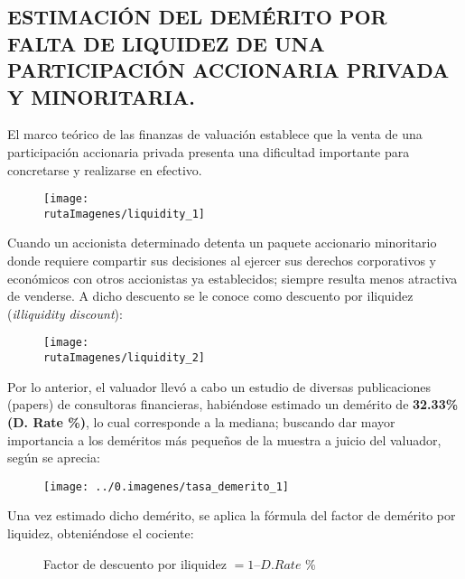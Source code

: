 \newcommand{\valorIliquidezM}{88}
\newcommand{\valorIliquidezm}{781}
\newcommand{\valorIliquidezc}{757}
\newcommand{\valorIliquidez}{\valorIliquidezM,\valorIliquidezm,\valorIliquidezc}
\newcommand{\valorIliquidezLetra}{\Numberstringnum{\valorIliquidezM}{} millones, \numberstringnum{\valorIliquidezm}{} mil, \numberstringnum{\valorIliquidezc}}


\subsection{ESTIMACI\'ON DEL DEM\'ERITO POR FALTA DE LIQUIDEZ DE UNA PARTICIPACIÓN ACCIONARIA PRIVADA Y MINORITARIA.}

El marco te\'orico de las finanzas de valuaci\'on establece que la venta de una participaci\'on accionaria privada presenta una dificultad importante para concretarse y realizarse en efectivo.

\begin{figure}[H]
\centering
\texttt{[image: \\rutaImagenes/liquidity\_1]}
\end{figure} 

Cuando un accionista determinado detenta un paquete accionario minoritario donde requiere compartir sus decisiones al ejercer sus derechos corporativos y econ\'omicos con otros accionistas ya establecidos; siempre resulta menos atractiva de venderse. A dicho descuento se le conoce como descuento por iliquidez (\textit{illiquidity discount}):

\begin{figure}[H]
\centering
\texttt{[image: \\rutaImagenes/liquidity\_2]}
\end{figure} 

Por lo anterior, el valuador llev\'o a cabo un estudio de diversas publicaciones (papers) de consultoras financieras, habi\'endose estimado un dem\'erito de \textcolor{principal}{\textbf{32.33\% (D. Rate \%)}}, lo cual corresponde a la mediana; buscando dar mayor importancia a los dem\'eritos m\'as peque\~nos de la muestra a juicio del valuador, seg\'un se aprecia:

\begin{figure}[H]
\centering
\texttt{[image: ../0.imagenes/tasa\_demerito\_1]}
\end{figure} 

Una vez estimado dicho dem\'erito, se aplica la f\'ormula del factor de dem\'erito por liquidez, obteni\'endose el cociente: 

\begin{figure}[H]
\centering
Factor de descuento por iliquidez $= 1 – D. Rate$ \%\\

\end{figure} 

